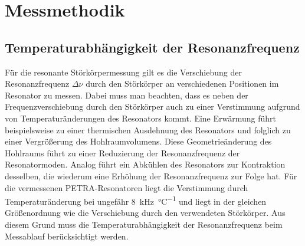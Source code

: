 \section{Messmethodik}
\label{sec:messmethodik}

\subsection{Temperaturabhängigkeit der Resonanzfrequenz}
\label{sec:temperaturabh_resonanzfrequenz}
Für die resonante Störkörpermessung gilt es die Verschiebung der Resonanzfrequenz $\Delta \nu$ durch den Störkörper an verschiedenen Positionen im Resonator zu messen.
Dabei muss man beachten, dass es neben der Frequenzverschiebung durch den Störkörper auch zu einer Verstimmung aufgrund von Temperaturänderungen des Resonators kommt.
Eine Erwärmung führt beispielsweise zu einer thermischen Ausdehnung des Resonators und folglich zu einer Vergrößerung des Hohlraumvolumens.
Diese Geometrieänderung des Hohlraums führt zu einer Reduzierung der Resonanzfrequenz der Resonatormoden.
Analog führt ein Abkühlen des Resonators zur Kontraktion desselben, die wiederum eine Erhöhung der Resonanzfrequenz zur Folge hat. Für die vermessenen PETRA-Resonatoren liegt die Verstimmung durch Temperaturänderung bei ungefähr \SI{8}{\kilo\hertz\per\celsius} \cite{desy_petra} und liegt in der gleichen Größenordnung wie die Verschiebung durch den verwendeten Störkörper.
Aus diesem Grund muss die Temperaturabhängigkeit der Resonanzfrequenz beim Messablauf berücksichtigt werden.

